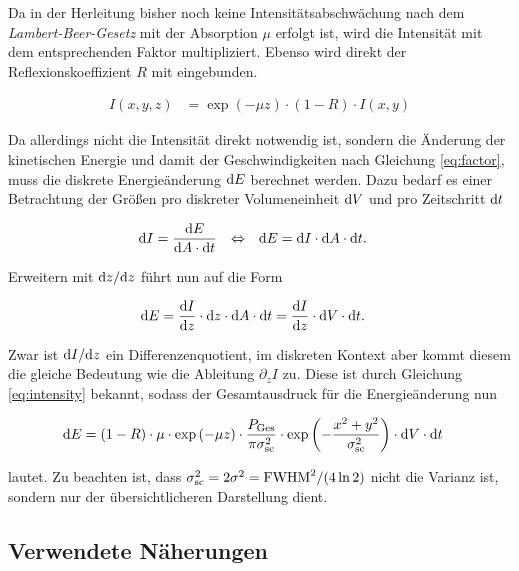 		Da in der Herleitung bisher noch keine Intensitätsabschwächung nach dem
		\emph{Lambert-Beer-Gesetz} mit der Absorption $\mu$ erfolgt ist, wird die Intensität mit
		dem entsprechenden Faktor multipliziert. Ebenso wird direkt der Reflexionskoeffizient
		$R$ mit eingebunden.

		\begin{align}
			I(x,y,z) &= \exp\left(-\mu z\right) \cdot (1-R) \cdot I(x,y)
			\label{eq:intensity}
		\end{align}

		Da allerdings nicht die Intensität direkt notwendig ist, sondern die Änderung der
		kinetischen Energie und damit der Geschwindigkeiten nach Gleichung \eqref{eq:factor}, muss
		die diskrete Energieänderung $\dx[E]$ berechnet werden. Dazu bedarf es einer Betrachtung
		der Größen pro diskreter Volumeneinheit $\dx[V]$ und pro Zeitschritt $\dt$

		\begin{align}
			\dx[I] &= \frac{\dx[E]}{\dx[A]\cdot\dt}
			&\Leftrightarrow&&
			\dx[E] &= \dx[I] \cdot \dx[A] \cdot \dt
			.
		\end{align}

		Erweitern mit $\dx[z]/\dx[z]$ führt nun auf die Form

		\begin{align}
			\dx[E] &= \frac{\dx[I]}{\dx[z]} \cdot \dx[z] \cdot \dx[A] \cdot \dt
				= \frac{\dx[I]}{\dx[z]} \cdot \dx[V] \cdot \dt
			.
			\label{eq:energy_diff_1}
		\end{align}

		Zwar ist $\dx[I]/\dx[z]$ ein Differenzenquotient, im diskreten Kontext aber kommt diesem
		die gleiche Bedeutung wie die Ableitung $\partial_z I$ zu. Diese ist durch Gleichung
		\eqref{eq:intensity} bekannt, sodass der Gesamtausdruck für die Energieänderung nun

		\begin{align}
			\dx[E] &= (1-R) \cdot \mu \cdot \exp\left(-\mu z\right)
				\cdot \frac{P_\text{Ges}}{\pi \sigma_\text{sc}^2}
				\cdot \exp\left(-\frac{x^2 + y^2}{\sigma_\text{sc}^2}\right)
				\cdot \dx[V] \cdot \dt
		\end{align}

		lautet. Zu beachten ist, dass $\sigma_\text{sc}^2 = 2\sigma^2 = \fwhm^2/(4\ln2)$ nicht die
		Varianz ist, sondern nur der übersichtlicheren Darstellung dient.

	\subsection{Verwendete Näherungen}
		\label{subsec:approximation}
